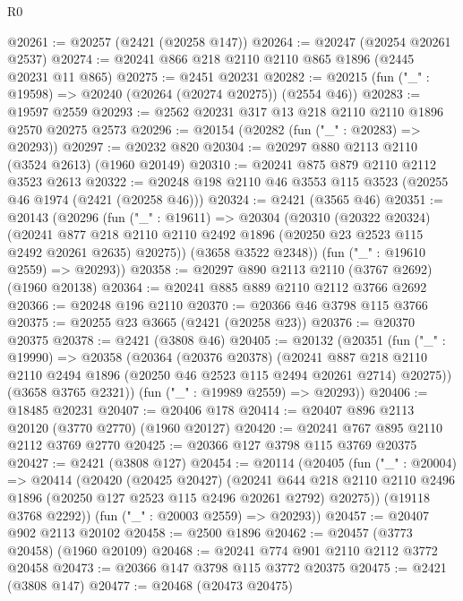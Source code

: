 \begin{lexlean}{R0}
\begin{coremodule}
@20261 := @20257 (@2421 (@20258 @147))
@20264 := @20247 (@20254 @20261 @2537)
@20274 := @20241 @866 @218 @2110 @2110 @865 @1896 (@2445 @20231 @11 @865)
@20275 := @2451 @20231
@20282 := @20215 (fun ("_" : @19598) => @20240 (@20264 (@20274 @20275)) (@2554 @46))
@20283 := @19597 @2559
@20293 := @2562 @20231 @317 @13 @218 @2110 @2110 @1896 @2570 @20275 @2573
@20296 := @20154 (@20282 (fun ("_" : @20283) => @20293))
@20297 := @20232 @820
@20304 := @20297 @880 @2113 @2110 (@3524 @2613) (@1960 @20149)
@20310 := @20241 @875 @879 @2110 @2112 @3523 @2613
@20322 := @20248 @198 @2110 @46 @3553 @115 @3523 (@20255 @46 @1974 (@2421 (@20258 @46)))
@20324 := @2421 (@3565 @46)
@20351 := @20143
    (@20296
      (fun ("_" : @19611) =>
      @20304
        (@20310
          (@20322 @20324)
          (@20241
            @877
            @218
            @2110
            @2110
            @2492
            @1896
            (@20250 @23 @2523 @115 @2492 @20261 @2635)
            @20275))
        (@3658 @3522 @2348))
      (fun ("_" : @19610 @2559) => @20293))
@20358 := @20297 @890 @2113 @2110 (@3767 @2692) (@1960 @20138)
@20364 := @20241 @885 @889 @2110 @2112 @3766 @2692
@20366 := @20248 @196 @2110
@20370 := @20366 @46 @3798 @115 @3766
@20375 := @20255 @23 @3665 (@2421 (@20258 @23))
@20376 := @20370 @20375
@20378 := @2421 (@3808 @46)
@20405 := @20132
    (@20351
      (fun ("_" : @19990) =>
      @20358
        (@20364
          (@20376 @20378)
          (@20241
            @887
            @218
            @2110
            @2110
            @2494
            @1896
            (@20250 @46 @2523 @115 @2494 @20261 @2714)
            @20275))
        (@3658 @3765 @2321))
      (fun ("_" : @19989 @2559) => @20293))
@20406 := @18485 @20231
@20407 := @20406 @178
@20414 := @20407 @896 @2113 @20120 (@3770 @2770) (@1960 @20127)
@20420 := @20241 @767 @895 @2110 @2112 @3769 @2770
@20425 := @20366 @127 @3798 @115 @3769 @20375
@20427 := @2421 (@3808 @127)
@20454 := @20114
    (@20405
      (fun ("_" : @20004) =>
      @20414
        (@20420
          (@20425 @20427)
          (@20241
            @644
            @218
            @2110
            @2110
            @2496
            @1896
            (@20250 @127 @2523 @115 @2496 @20261 @2792)
            @20275))
        (@19118 @3768 @2292))
      (fun ("_" : @20003 @2559) => @20293))
@20457 := @20407 @902 @2113 @20102
@20458 := @2500 @1896
@20462 := @20457 (@3773 @20458) (@1960 @20109)
@20468 := @20241 @774 @901 @2110 @2112 @3772 @20458
@20473 := @20366 @147 @3798 @115 @3772 @20375
@20475 := @2421 (@3808 @147)
@20477 := @20468 (@20473 @20475)

\end{coremodule}
\end{lexlean}
